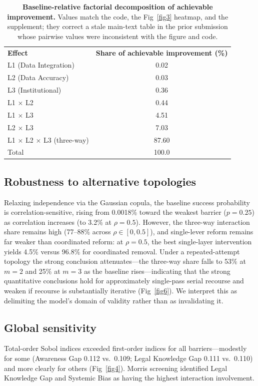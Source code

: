 \documentclass[10pt,letterpaper]{article}
\newlength\savedwidth
\newcommand\thickhline{\noalign{\global\savedwidth\arrayrulewidth\global\arrayrulewidth 2pt}\hline\noalign{\global\arrayrulewidth\savedwidth}}
\begin{document}
\begin{table}[htbp]
\centering
\caption{{\bf Baseline-relative factorial decomposition of achievable improvement.} Values match the code, the Fig~\ref{fig3} heatmap, and the supplement; they correct a stale main-text table in the prior submission whose pairwise values were inconsistent with the figure and code.}
\label{table2}
\begin{tabular}{l c}
\hline
\textbf{Effect} & \textbf{Share of achievable improvement (\%)} \\
\thickhline
L1 (Data Integration) & 0.02 \\
L2 (Data Accuracy) & 0.03 \\
L3 (Institutional) & 0.36 \\ \hline
L1 $\times$ L2 & 0.44 \\
L1 $\times$ L3 & 4.51 \\
L2 $\times$ L3 & 7.03 \\ \hline
L1 $\times$ L2 $\times$ L3 (three-way) & 87.60 \\ \thickhline
Total & 100.0 \\
\hline
\end{tabular}
\end{table}

\subsection*{Robustness to alternative topologies}
Relaxing independence via the Gaussian copula, the baseline success probability is correlation-sensitive, rising from 0.0018\% toward the weakest barrier ($p=0.25$) as correlation increases (to 3.2\% at $\rho=0.5$). However, the three-way interaction share remains high (77--88\% across $\rho\in[0,0.5]$), and single-lever reform remains far weaker than coordinated reform: at $\rho=0.5$, the best single-layer intervention yields 4.5\% versus 96.8\% for coordinated removal. Under a repeated-attempt topology the strong conclusion attenuates---the three-way share falls to 53\% at $m=2$ and 25\% at $m=3$ as the baseline rises---indicating that the strong quantitative conclusions hold for approximately single-pass serial recourse and weaken if recourse is substantially iterative (Fig~\ref{fig6}). We interpret this as delimiting the model's domain of validity rather than as invalidating it.

\subsection*{Global sensitivity}
Total-order Sobol indices exceeded first-order indices for all barriers---modestly for some (Awareness Gap 0.112 vs.\ 0.109; Legal Knowledge Gap 0.111 vs.\ 0.110) and more clearly for others (Fig~\ref{fig4}). Morris screening identified Legal Knowledge Gap and Systemic Bias as having the highest interaction involvement.
\end{document}
